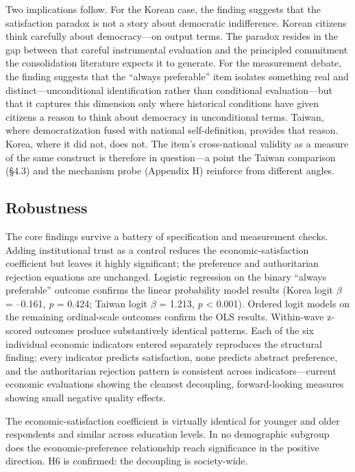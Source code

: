 \documentclass[
  12pt,
  12pt,
  letterpaper]{article}
\begin{document}
Two implications follow. For the Korean case, the finding suggests that
the satisfaction paradox is not a story about democratic indifference.
Korean citizens think carefully about democracy---on output terms. The
paradox resides in the gap between that careful instrumental evaluation
and the principled commitment the consolidation literature expects it to
generate. For the measurement debate, the finding suggests that the
``always preferable'' item isolates something real and
distinct---unconditional identification rather than conditional
evaluation---but that it captures this dimension only where historical
conditions have given citizens a reason to think about democracy in
unconditional terms. Taiwan, where democratization fused with national
self-definition, provides that reason. Korea, where it did not, does
not. The item's cross-national validity as a measure of the same
construct is therefore in question---a point the Taiwan comparison
(§4.3) and the mechanism probe (Appendix H) reinforce from different
angles.

\subsection{Robustness}\label{sec-results-robustness}

The core findings survive a battery of specification and measurement
checks. Adding institutional trust as a control reduces the
economic-satisfaction coefficient but leaves it highly significant; the
preference and authoritarian rejection equations are unchanged. Logistic
regression on the binary ``always preferable'' outcome confirms the
linear probability model results (Korea logit \(\beta\) = --0.161,
\emph{p} = 0.424; Taiwan logit \(\beta\) = 1.213, \emph{p} \textless{}
0.001). Ordered logit models on the remaining ordinal-scale outcomes
confirm the OLS results. Within-wave z-scored outcomes produce
substantively identical patterns. Each of the six individual economic
indicators entered separately reproduces the structural finding: every
indicator predicts satisfaction, none predicts abstract preference, and
the authoritarian rejection pattern is consistent across
indicators---current economic evaluations showing the cleanest
decoupling, forward-looking measures showing small negative quality
effects.

The economic-satisfaction coefficient is virtually identical for younger
and older respondents and similar across education levels. In no
demographic subgroup does the economic-preference relationship reach
significance in the positive direction. H6 is confirmed: the decoupling
is society-wide.
\end{document}
